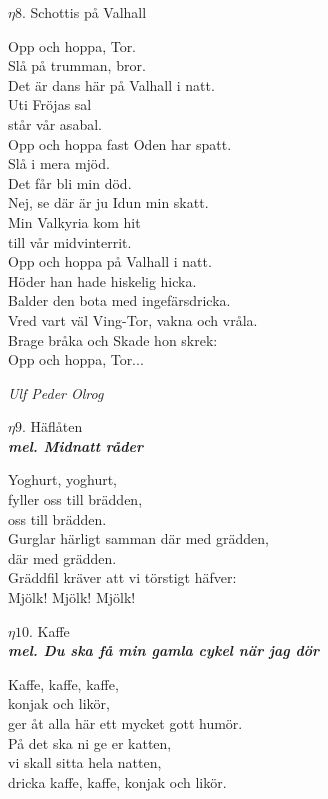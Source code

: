 \documentclass[a6paper,10pt]{article}
\newcommand{\mel}[1]{\small\textbf{\textit{mel. #1 \\}}}
\newcommand{\notis}[1]{\begin{flushright}\textit{#1}\end{flushright}}
\begin{document}
\setlength{\oddsidemargin}{-0.47in}
\noindent
\begin{center}
\Large $\eta8$. Schottis på Valhall\\
\end{center}
Opp och hoppa, Tor.\\
Slå på trumman, bror.\\
Det är dans här på Valhall i natt.\\
Uti Fröjas sal\\
står vår asabal.\\
Opp och hoppa fast Oden har spatt.\\
Slå i mera mjöd.\\
Det får bli min död.\\
Nej, se där är ju Idun min skatt.\\
Min Valkyria kom hit\\
till vår midvinterrit.\\
Opp och hoppa på Valhall i natt.
\vspace{5pt}\\
Höder han hade hiskelig hicka.\\
Balder den bota med ingefärsdricka.\\
Vred vart väl Ving-Tor, vakna och vråla.\\
Brage bråka och Skade hon skrek:
\vspace{5pt}\\
Opp och hoppa, Tor... 
\notis{Ulf Peder Olrog}

\setlength{\oddsidemargin}{-0.37in}
\noindent
\begin{center}
\Large $\eta9$. Häflåten\\
\mel{Midnatt råder}
\end{center}
Yoghurt, yoghurt,\\
fyller oss till brädden,\\
oss till brädden.\\
Gurglar härligt samman där med grädden,\\
där med grädden.\\
Gräddfil kräver att vi törstigt häfver:\\
Mjölk! Mjölk! Mjölk!
\vspace{40pt}
\begin{center}
\Large $\eta10$. Kaffe\\
\mel{Du ska få min gamla cykel när jag dör}
\end{center}
Kaffe, kaffe, kaffe,\\
konjak och likör,\\
ger åt alla här ett mycket gott humör.\\
På det ska ni ge er katten,\\
vi skall sitta hela natten,\\
dricka kaffe, kaffe, konjak och likör.
\end{document}
